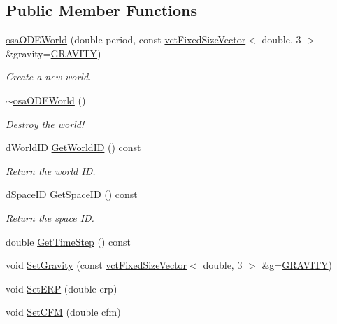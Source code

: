 \subsection*{Public Member Functions}
\begin{DoxyCompactItemize}
\item 
\hyperlink{classosa_o_d_e_world_a2d8285b050f2ab13a18813579ba5f540}{osa\-O\-D\-E\-World} (double period, const \hyperlink{classvct_fixed_size_vector}{vct\-Fixed\-Size\-Vector}$<$ double, 3 $>$ \&gravity=\hyperlink{classosa_o_d_e_world_ae1d291977a1d6305cea26a6bd87fa320}{G\-R\-A\-V\-I\-T\-Y})
\begin{DoxyCompactList}\small\item\em Create a new world. \end{DoxyCompactList}\item 
\hyperlink{classosa_o_d_e_world_a671448e0f6dd7cc68f350d8757547e50}{$\sim$osa\-O\-D\-E\-World} ()
\begin{DoxyCompactList}\small\item\em Destroy the world! \end{DoxyCompactList}\item 
d\-World\-I\-D \hyperlink{classosa_o_d_e_world_a872dbc2ae690fed8bf9a5b9afbf78ca4}{Get\-World\-I\-D} () const 
\begin{DoxyCompactList}\small\item\em Return the world I\-D. \end{DoxyCompactList}\item 
d\-Space\-I\-D \hyperlink{classosa_o_d_e_world_a0e95c5907ccc33463f2633c475d0a5a4}{Get\-Space\-I\-D} () const 
\begin{DoxyCompactList}\small\item\em Return the space I\-D. \end{DoxyCompactList}\item 
double \hyperlink{classosa_o_d_e_world_a33a419109ea4b150409425beb7b2a876}{Get\-Time\-Step} () const 
\item 
void \hyperlink{classosa_o_d_e_world_ac1992945835ed570eac30ffa061c338a}{Set\-Gravity} (const \hyperlink{classvct_fixed_size_vector}{vct\-Fixed\-Size\-Vector}$<$ double, 3 $>$ \&g=\hyperlink{classosa_o_d_e_world_ae1d291977a1d6305cea26a6bd87fa320}{G\-R\-A\-V\-I\-T\-Y})
\item 
void \hyperlink{classosa_o_d_e_world_adde150945d4cdb4ba1ac5175e4b0a077}{Set\-E\-R\-P} (double erp)
\item 
void \hyperlink{classosa_o_d_e_world_ad128462aa9d1fcb9fd73a8be25fa1452}{Set\-C\-F\-M} (double cfm)

\end{DoxyCompactItemize}
